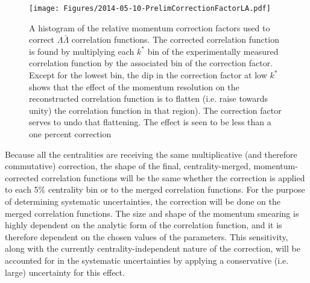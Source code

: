 \begin{figure}
\texttt{[image: Figures/2014-05-10-PrelimCorrectionFactorLA.pdf]}
\caption[Relative momentum correction factor for $\Lambda\bar{\Lambda}$]{A histogram of the relative momentum correction factors used to correct $\Lambda\bar{\Lambda}$ correlation functions.  
The corrected correlation function is found by multiplying each $k^*$ bin of the experimentally measured correlation function by the associated bin of the correction factor.  
Except for the lowest bin, the dip in the correction factor at low $k^*$ shows that the effect of the momentum resolution on the reconstructed correlation function is to flatten (i.e. raise towards unity) the correlation function in that region).  
The correction factor serves to undo that flattening.  
The effect is seen to be less than a one percent correction}
\label{fig:MomCorrectionFactorLA}
\end{figure}

Because all the centralities are receiving the same multiplicative (and therefore commutative) correction, the shape of the final, centrality-merged, momentum-corrected correlation functions will be the same whether the correction is applied to each 5\% centrality bin or to the merged correlation functions.  
For the purpose of determining systematic uncertainties, the correction will be done on the merged correlation functions.  
The size and shape of the momentum smearing is highly dependent on the analytic form of the correlation function, and it is therefore dependent on the chosen values of the parameters.  
This sensitivity, along with the currently centrality-independent nature of the correction, will be accounted for in the systematic uncertainties by applying a conservative (i.e. large) uncertainty for this effect.  
